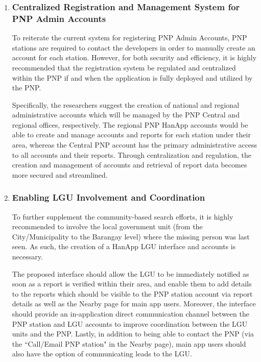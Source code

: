 \begin{enumerate}
    \item \subsubsection{Centralized Registration and Management System for PNP Admin Accounts}
To reiterate the current system for registering PNP Admin Accounts, PNP stations are required to contact the developers in order to manually create an account for each station. However, for both security and efficiency, it is highly recommended that the registration system be regulated and centralized within the PNP if and when the application is fully deployed and utilized by the PNP. 

Specifically, the researchers suggest the creation of national and regional administrative accounts which will be managed by the PNP Central and regional offices, respectively. The regional PNP HanApp accounts would be able to create and manage accounts and reports for each station under their area, whereas the Central PNP account has the primary administrative access to all accounts and their reports. Through centralization and regulation, the creation and management of accounts and retrieval of report data becomes more secured and streamlined.

\item \subsubsection{Enabling LGU Involvement and Coordination}
To further supplement the community-based search efforts, it is highly recommended to involve the local government unit (from the City/Municipality to the Barangay level) where the missing person was last seen. As such, the creation of a HanApp LGU interface and accounts is necessary. 

The proposed interface should allow the LGU to be immediately notified as soon as a report is verified within their area, and enable them to add details to the reports which should be visible to the PNP station account via report details as well as the Nearby page for main app users. Moreover, the interface should provide an in-application direct communication channel between the PNP station and LGU accounts to improve coordination between the LGU units and the PNP. Lastly, in addition to being able to contact the PNP (via the ``Call/Email PNP station" in the Nearby page), main app users should also have the option of communicating leads to the LGU.


\end{enumerate}
